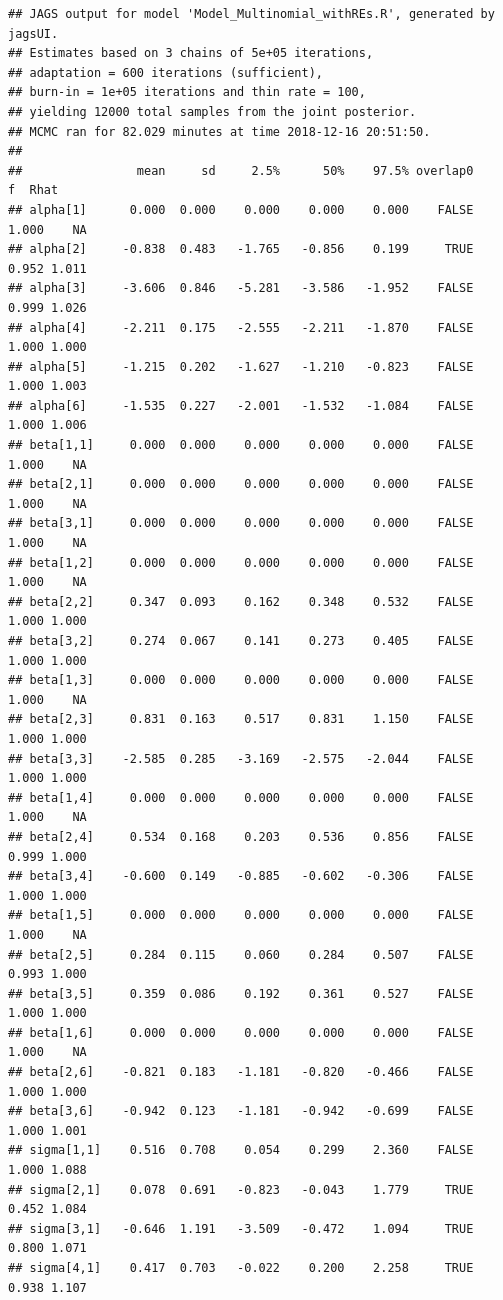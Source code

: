\documentclass[]{article}
\begin{document}
\begin{verbatim}
## JAGS output for model 'Model_Multinomial_withREs.R', generated by jagsUI.
## Estimates based on 3 chains of 5e+05 iterations,
## adaptation = 600 iterations (sufficient),
## burn-in = 1e+05 iterations and thin rate = 100,
## yielding 12000 total samples from the joint posterior. 
## MCMC ran for 82.029 minutes at time 2018-12-16 20:51:50.
## 
##                mean     sd     2.5%      50%    97.5% overlap0     f  Rhat
## alpha[1]      0.000  0.000    0.000    0.000    0.000    FALSE 1.000    NA
## alpha[2]     -0.838  0.483   -1.765   -0.856    0.199     TRUE 0.952 1.011
## alpha[3]     -3.606  0.846   -5.281   -3.586   -1.952    FALSE 0.999 1.026
## alpha[4]     -2.211  0.175   -2.555   -2.211   -1.870    FALSE 1.000 1.000
## alpha[5]     -1.215  0.202   -1.627   -1.210   -0.823    FALSE 1.000 1.003
## alpha[6]     -1.535  0.227   -2.001   -1.532   -1.084    FALSE 1.000 1.006
## beta[1,1]     0.000  0.000    0.000    0.000    0.000    FALSE 1.000    NA
## beta[2,1]     0.000  0.000    0.000    0.000    0.000    FALSE 1.000    NA
## beta[3,1]     0.000  0.000    0.000    0.000    0.000    FALSE 1.000    NA
## beta[1,2]     0.000  0.000    0.000    0.000    0.000    FALSE 1.000    NA
## beta[2,2]     0.347  0.093    0.162    0.348    0.532    FALSE 1.000 1.000
## beta[3,2]     0.274  0.067    0.141    0.273    0.405    FALSE 1.000 1.000
## beta[1,3]     0.000  0.000    0.000    0.000    0.000    FALSE 1.000    NA
## beta[2,3]     0.831  0.163    0.517    0.831    1.150    FALSE 1.000 1.000
## beta[3,3]    -2.585  0.285   -3.169   -2.575   -2.044    FALSE 1.000 1.000
## beta[1,4]     0.000  0.000    0.000    0.000    0.000    FALSE 1.000    NA
## beta[2,4]     0.534  0.168    0.203    0.536    0.856    FALSE 0.999 1.000
## beta[3,4]    -0.600  0.149   -0.885   -0.602   -0.306    FALSE 1.000 1.000
## beta[1,5]     0.000  0.000    0.000    0.000    0.000    FALSE 1.000    NA
## beta[2,5]     0.284  0.115    0.060    0.284    0.507    FALSE 0.993 1.000
## beta[3,5]     0.359  0.086    0.192    0.361    0.527    FALSE 1.000 1.000
## beta[1,6]     0.000  0.000    0.000    0.000    0.000    FALSE 1.000    NA
## beta[2,6]    -0.821  0.183   -1.181   -0.820   -0.466    FALSE 1.000 1.000
## beta[3,6]    -0.942  0.123   -1.181   -0.942   -0.699    FALSE 1.000 1.001
## sigma[1,1]    0.516  0.708    0.054    0.299    2.360    FALSE 1.000 1.088
## sigma[2,1]    0.078  0.691   -0.823   -0.043    1.779     TRUE 0.452 1.084
## sigma[3,1]   -0.646  1.191   -3.509   -0.472    1.094     TRUE 0.800 1.071
## sigma[4,1]    0.417  0.703   -0.022    0.200    2.258     TRUE 0.938 1.107

\end{verbatim}
\end{document}
